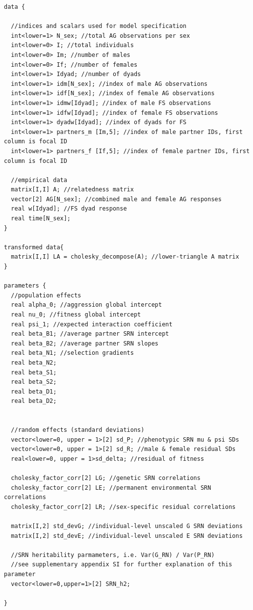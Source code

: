 \documentclass[
]{book}
\begin{document}
\begin{verbatim}
data {
  
  //indices and scalars used for model specification
  int<lower=1> N_sex; //total AG observations per sex
  int<lower=0> I; //total individuals
  int<lower=0> Im; //number of males
  int<lower=0> If; //number of females
  int<lower=1> Idyad; //number of dyads
  int<lower=1> idm[N_sex]; //index of male AG observations
  int<lower=1> idf[N_sex]; //index of female AG observations
  int<lower=1> idmw[Idyad]; //index of male FS observations
  int<lower=1> idfw[Idyad]; //index of female FS observations
  int<lower=1> dyadw[Idyad]; //index of dyads for FS
  int<lower=1> partners_m [Im,5]; //index of male partner IDs, first column is focal ID
  int<lower=1> partners_f [If,5]; //index of female partner IDs, first column is focal ID
  
  //empirical data
  matrix[I,I] A; //relatedness matrix
  vector[2] AG[N_sex]; //combined male and female AG responses
  real w[Idyad]; //FS dyad response
  real time[N_sex];
}

transformed data{
  matrix[I,I] LA = cholesky_decompose(A); //lower-triangle A matrix
}

parameters {
  //population effects
  real alpha_0; //aggression global intercept
  real nu_0; //fitness global intercept
  real psi_1; //expected interaction coefficient
  real beta_B1; //average partner SRN intercept
  real beta_B2; //average partner SRN slopes
  real beta_N1; //selection gradients
  real beta_N2;
  real beta_S1;
  real beta_S2;
  real beta_D1;
  real beta_D2;
  
  
  //random effects (standard deviations)
  vector<lower=0, upper = 1>[2] sd_P; //phenotypic SRN mu & psi SDs
  vector<lower=0, upper = 1>[2] sd_R; //male & female residual SDs
  real<lower=0, upper = 1>sd_delta; //residual of fitness

  cholesky_factor_corr[2] LG; //genetic SRN correlations
  cholesky_factor_corr[2] LE; //permanent environmental SRN correlations
  cholesky_factor_corr[2] LR; //sex-specific residual correlations
  
  matrix[I,2] std_devG; //individual-level unscaled G SRN deviations
  matrix[I,2] std_devE; //individual-level unscaled E SRN deviations
  
  //SRN heritability parmameters, i.e. Var(G_RN) / Var(P_RN) 
  //see supplementary appendix SI for further explanation of this parameter
  vector<lower=0,upper=1>[2] SRN_h2;
  
}


\end{verbatim}
\end{document}

